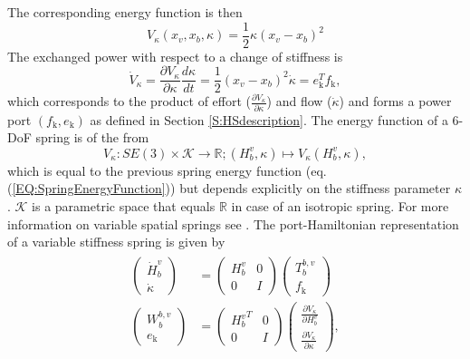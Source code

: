 \documentclass[a4paper,twoside, openright,12pt]{report}
\newcommand{\g}[1]{\text{#1}}
\begin{document}
The corresponding energy function is then
\begin{equation}
V_{\kappa}(x_v,x_b,\kappa) = \frac{1}{2} \kappa (x_v-x_b)^2
\end{equation}    
The exchanged power with respect to a change of stiffness is 
\begin{equation}
\dot{V}_{\kappa} =\frac{\partial V_{\kappa}}{\partial \kappa} \frac{d \kappa}{dt} = \frac{1}{2} (x_v-x_b)^2 \dot{\kappa} = e_\g{k}^Tf_\g{k},
\end{equation}
which corresponds to the product of effort ($\frac{\partial V_{\kappa}}{\partial \kappa}$) and flow ($\dot{\kappa}$) and forms a power port $(f_\g{k},e_\g{k})$ as defined in Section \ref{S:HSdescription}. The energy function of a $6$-DoF spring is of the from
\begin{equation}
V_{\kappa}:SE(3) \times \mathcal{K} \rightarrow \mathbb{R}; (H_b^v,\kappa)\mapsto V_{\kappa}(H_b^v,\kappa),
\end{equation}
which is equal to the previous spring energy function (eq. (\ref{EQ:SpringEnergyFunction})) but depends explicitly on the stiffness parameter $\kappa$. $\mathcal{K}$ is a parametric space that equals $\mathbb{R}$ in case of an isotropic spring. For more information on variable spatial springs see \cite{Stramigioli_01c}. The port-Hamiltonian representation of a variable stiffness spring is given by
\begin{eqnarray}
\begin{aligned}
\begin{pmatrix}
\dot{H}_b^v \\ \dot{\kappa}
\end{pmatrix}
&=
\begin{pmatrix}
H_b^v & 0 \\ 0 & I
\end{pmatrix}
\begin{pmatrix}
T_b^{b,v} \\ f_\g{k}
\end{pmatrix}
\\
\begin{pmatrix}
W_b^{b,v} \\ e_\g{k}
\end{pmatrix}
&=
\begin{pmatrix}
{H_b^v}^T & 0 \\ 0 & I
\end{pmatrix}
\begin{pmatrix}
\frac{\partial V_{\kappa}}{\partial H_b^v} \\ \frac{\partial V_{\kappa}}{\partial \kappa}
\end{pmatrix},
\end{aligned}
\end{eqnarray}
\end{document}
